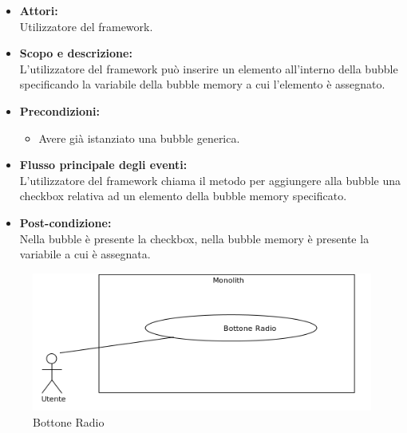 \begin{itemize}
	\item \textbf{Attori:}
	\\Utilizzatore del framework.
	\item \textbf{Scopo e descrizione:} 
	\\L'utilizzatore del framework può inserire un elemento  all'interno della bubble specificando la variabile della bubble memory a cui l'elemento è assegnato.
	\item \textbf{Precondizioni:}
	\begin{itemize}
		\item Avere già istanziato una bubble generica.
	\end{itemize}
	\item \textbf{Flusso principale degli eventi:}
	\\L'utilizzatore del framework chiama il metodo per aggiungere alla bubble una checkbox relativa ad un elemento della bubble memory specificato.
	\item \textbf{Post-condizione:}
	\\Nella bubble è presente la checkbox, nella bubble memory è presente la variabile a cui è assegnata.
\end{itemize}


\begin{figure}[H]
	\centering
	\includegraphics[width=15cm]{../../documenti/AnalisiDeiRequisiti/Diagrammi_img/uc1_31.png}
	\caption{\UCFCaption{} Bottone Radio}
\end{figure}

